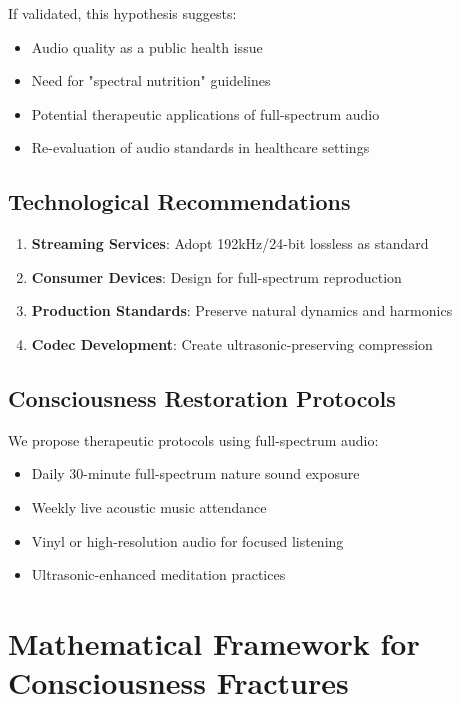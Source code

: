 \documentclass[12pt,a4paper]{article}
\begin{document}
If validated, this hypothesis suggests:

\begin{itemize}
\item Audio quality as a public health issue
\item Need for "spectral nutrition" guidelines
\item Potential therapeutic applications of full-spectrum audio
\item Re-evaluation of audio standards in healthcare settings
\end{itemize}

\subsection{Technological Recommendations}

\begin{enumerate}
\item \textbf{Streaming Services}: Adopt 192kHz/24-bit lossless as standard
\item \textbf{Consumer Devices}: Design for full-spectrum reproduction
\item \textbf{Production Standards}: Preserve natural dynamics and harmonics
\item \textbf{Codec Development}: Create ultrasonic-preserving compression
\end{enumerate}

\subsection{Consciousness Restoration Protocols}

We propose therapeutic protocols using full-spectrum audio:

\begin{itemize}
\item Daily 30-minute full-spectrum nature sound exposure
\item Weekly live acoustic music attendance
\item Vinyl or high-resolution audio for focused listening
\item Ultrasonic-enhanced meditation practices
\end{itemize}

\section{Mathematical Framework for Consciousness Fractures}
\end{document}
